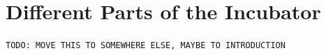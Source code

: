 \documentclass[../../main]{subfiles}
\begin{document}
\section{Different Parts of the Incubator} \label{sec:}

\texttt{TODO: MOVE THIS TO SOMEWHERE ELSE, MAYBE TO INTRODUCTION}

%
%
%
%
%
%
\end{document}
